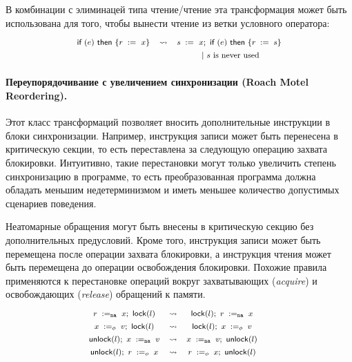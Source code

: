 В комбинации с элиминацей типа чтение/чтение 
эта трансформация может быть использована 
для того, чтобы вынести чтение из 
ветки условного оператора:
%
\[\def\arraystretch{1.4}\footnotesize
  \begin{array}{ccc} 

      \kw{if} (e)~ \kw{then} \{ \readInst{}{r}{x} \}
    & \leadsto 
    & \readInst{}{s}{x} \seq \kw{if} (e)~ \kw{then} \{ \assignInst{r}{s} \} \\
    & & ~|~ \text{$s$ is never used}  \\ 

  \end{array}
\]

\paragraph{
Переупорядочивание с увеличением синхронизации
(Roach Motel Reordering).
}

Этот класс трансформаций позволяет вносить дополнительные инструкции в блоки синхронизации. 
Например, инструкция записи может быть 
перенесена в критическую секции, то есть
переставлена за следующую операцию захвата блокировки. 
Интуитивно, такие перестановки могут 
только увеличить степень синхронизацию в программе, 
то есть преобразованная программа 
должна обладать меньшим недетерминизмом 
и иметь меньшее количество допустимых сценариев поведения. 

Неатомарные обращения могут быть внесены 
в критическую секцию без дополнительных предусловий. 
Кроме того, инструкция записи может быть перемещена после 
операции захвата блокировки, а инструкция чтения 
может быть перемещена до операции освобождения блокировки. 
Похожие правила применяются к перестановке операций вокруг 
захватывающих (\emph{acquire}) и освобождающих (\emph{release}) 
обращений к памяти. 
\[\def\arraystretch{1.4}\footnotesize
  \begin{array}{cccl} 

      \readInst{\na}{r}{x} \seq \lockInst{l} 
    & \leadsto 
    & \lockInst{l} \seq \readInst{\na}{r}{x}
    & ~ \\ 

      \writeInst{o}{x}{v} \seq \lockInst{l} 
    & \leadsto 
    & \lockInst{l} \seq \writeInst{o}{x}{v}
    & ~  \\ 

      \unlockInst{l} \seq \writeInst{\na}{x}{v} 
    & \leadsto 
    & \writeInst{\na}{x}{v} \seq \unlockInst{l}
    & ~ \\ 


      \unlockInst{l} \seq \readInst{o}{r}{x} 
    & \leadsto 
    & \readInst{o}{r}{x} \seq \unlockInst{l}
    & ~  \\ 

  \end{array}
\]


